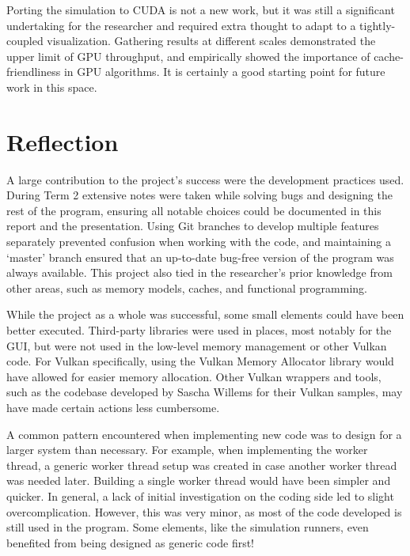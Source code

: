 Porting the simulation to CUDA is not a new work, but it was still a significant undertaking for the researcher and required extra thought to adapt to a tightly-coupled visualization.
Gathering results at different scales demonstrated the upper limit of GPU throughput, and empirically showed the importance of cache-friendliness in GPU algorithms.
It is certainly a good starting point for future work in this space.

\section{Reflection}
A large contribution to the project's success were the development practices used.
During Term 2 extensive notes were taken while solving bugs and designing the rest of the program, ensuring all notable choices could be documented in this report and the presentation.
Using Git branches to develop multiple features separately prevented confusion when working with the code, and maintaining a `master' branch ensured that an up-to-date bug-free version of the program was always available.
This project also tied in the researcher's prior knowledge from other areas, such as memory models, caches, and functional programming.

While the project as a whole was successful, some small elements could have been better executed.
Third-party libraries were used in places, most notably for the GUI, but were not used in the low-level memory management or other Vulkan code.
For Vulkan specifically, using the Vulkan Memory Allocator library\cite{GPUOpenVMA} would have allowed for easier memory allocation.
Other Vulkan wrappers and tools, such as the codebase developed by Sascha Willems for their Vulkan samples\cite{SaschaWillemsVulkan}, may have made certain actions less cumbersome.

A common pattern encountered when implementing new code was to design for a larger system than necessary.
For example, when implementing the worker thread, a generic worker thread setup was created in case another worker thread was needed later.
Building a single worker thread would have been simpler and quicker.
In general, a lack of initial investigation on the coding side led to slight overcomplication.
However, this was very minor, as most of the code developed is still used in the program.
Some elements, like the simulation runners, even benefited from being designed as generic code first!

